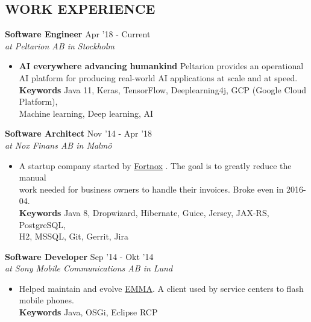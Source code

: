 \documentclass[overlapped]{res}
\begin{document}
 
\begin{resume}
\vspace{1.2cm}
\section{{\sc WORK EXPERIENCE}} 

{\bf Software Engineer} \hfill Apr '18 - Current \\
{\sl at Peltarion AB in Stockholm}
\begin{itemize}
\itemsep -1pt
\item {\bf AI everywhere advancing humankind} Peltarion provides an operational AI platform for producing real-world AI applications at scale and at speed.
\\{\bf Keywords} Java 11, Keras, TensorFlow, Deeplearning4j, GCP (Google Cloud Platform),
\\Machine learning, Deep learning, AI
\end{itemize}

{\bf Software Architect} \hfill Nov '14 - Apr '18 \\
{\sl at Nox Finans AB in Malmö}
\begin{itemize}
\itemsep -1pt
\item A startup company started by \href{http://www.fortnox.se/}{Fortnox} . The goal is to greatly reduce the manual 
\\work needed for business owners to handle their invoices. Broke even in 2016-04.
\\{\bf Keywords} Java 8, Dropwizard, Hibernate, Guice, Jersey, JAX-RS, PostgreSQL,
\\H2, MSSQL, Git, Gerrit, Jira
\end{itemize}

{\bf Software Developer} \hfill Sep '14 - Okt '14 \\
{\sl at Sony Mobile Communications AB in Lund}
\begin{itemize}
\itemsep -1pt
\item Helped maintain and evolve \href{http://emma.extranet.sonyericsson.com/emma/}{EMMA}. A client used by service centers to flash 
\\mobile phones.
\\{\bf Keywords} Java, OSGi, Eclipse RCP 
\end{itemize}


\end{resume}
\end{document}
